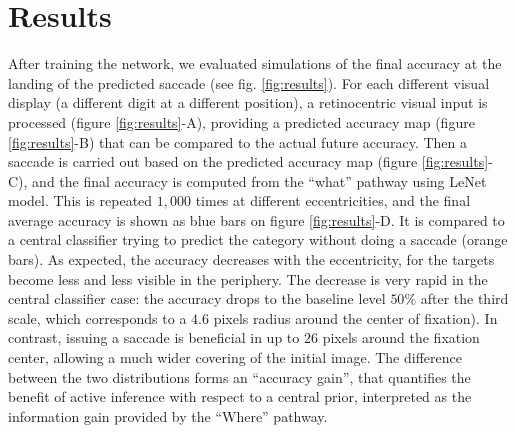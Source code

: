 \section{Results}
\label{sec:results}
After training the network, we evaluated simulations of the final accuracy at the landing of the predicted saccade (see fig. \ref{fig:results}). For each different visual display (a different digit at a different position), a retinocentric visual input is processed (figure \ref{fig:results}-A), providing a predicted accuracy map (figure \ref{fig:results}-B) that can be compared to the actual future accuracy. Then a saccade is carried out based on the predicted accuracy map (figure \ref{fig:results}-C), and the final accuracy is computed from the ``what'' pathway using LeNet model. This is repeated $1,000$ times at different eccentricities, and the final average accuracy is shown as blue bars on figure \ref{fig:results}-D. It is compared to a central classifier trying to predict the category without doing a saccade (orange bars). As expected, the  accuracy decreases with the eccentricity, for the targets become less and less visible in the periphery. The decrease is very rapid in the central classifier case: the accuracy drops to the baseline level $50 \%$ after the third scale, which corresponds to a $4.6$ pixels radius around the center of fixation). In contrast, issuing a saccade is beneficial in up to $26$ pixels around the fixation center, allowing a much wider covering of the initial image. The difference between the two distributions forms an ``accuracy gain'', that quantifies the benefit of active inference with respect to a central prior, interpreted as the information gain provided by the ``Where'' pathway.
